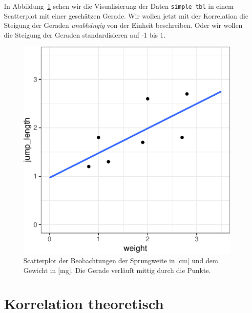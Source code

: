 \documentclass[
  letterpaper,
]{scrbook}
\begin{document}
In Abbildung~\ref{fig-scatter-corr-01} sehen wir die Visualisierung der
Daten \texttt{simple\_tbl} in einem Scatterplot mit einer geschätzen
Gerade. Wir wollen jetzt mit der Korrelation die Steigung der Geraden
\emph{unabhängig} von der Einheit beschreiben. Oder wir wollen die
Steigung der Geraden standardisieren auf -1 bis 1.

\begin{figure}

{\centering \includegraphics{./stat-linear-reg-corr_files/figure-pdf/fig-scatter-corr-01-1.pdf}

}

\caption{\label{fig-scatter-corr-01}Scatterplot der Beobachtungen der
Sprungweite in {[}cm{]} und dem Gewicht in {[}mg{]}. Die Gerade verläuft
mittig durch die Punkte.}

\end{figure}

\hypertarget{korrelation-theoretisch}{%
\section{Korrelation theoretisch}\label{korrelation-theoretisch}}

{}
\end{document}
